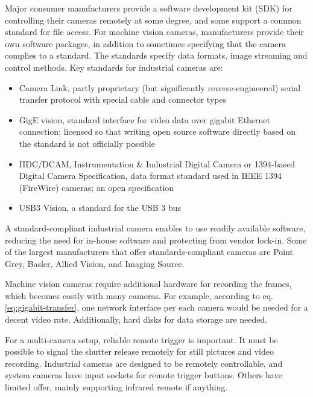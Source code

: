 Major consumer manufacturers provide a software development kit (SDK) for controlling their cameras remotely at some degree, and some support a common standard for file access.
For machine vision cameras, manufacturers provide their own software packages, in addition to sometimes specifying that the camera complies to a standard.
The standards specify data formats, image streaming and control methods.
Key standards for industrial cameras are:

\begin{itemize}
	\item Camera Link, partly proprietary (but significantly reverse-engineered) serial transfer protocol with special cable and connector types
	\item GigE vision, standard interface for video data over gigabit Ethernet connection; licensed so that writing open source software directly based on the standard is not officially possible
	\item IIDC/DCAM, Instrumentation \& Industrial Digital Camera or 1394-based Digital Camera Specification, data format standard used in IEEE 1394 (FireWire) cameras; an open specification
	\item USB3 Vision, a standard for the USB 3 bus
\end{itemize}

A standard-compliant industrial camera enables to use readily available software, reducing the need for in-house software and protecting from vendor lock-in.
Some of the largest manufacturers that offer standards-compliant cameras are Point Grey, Basler, Allied Vision, and Imaging Source.

Machine vision cameras require additional hardware for recording the frames, which becomes costly with many cameras.
For example, according to eq. \ref{eq:gigabit-transfer}, one network interface per each camera would be needed for a decent video rate.
Additionally, hard disks for data storage are needed.

For a multi-camera setup, reliable remote trigger is important.
It must be possible to signal the shutter release remotely for still pictures and video recording.
Industrial cameras are designed to be remotely controllable, and system cameras have input sockets for remote trigger buttons.
Others have limited offer, mainly supporting infrared remote if anything.


